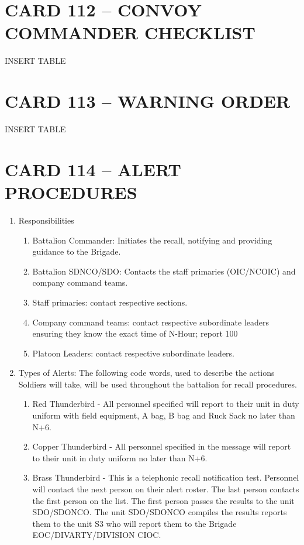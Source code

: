 \documentclass{article}
\begin{document}
\newpage
\section*{CARD 112 – CONVOY COMMANDER CHECKLIST}
INSERT TABLE

\newpage
\section*{CARD 113 – WARNING ORDER	}
INSERT TABLE

\newpage
\section*{CARD 114 – ALERT PROCEDURES}
\begin{enumerate}
    \item Responsibilities
    \begin{enumerate}
        \item Battalion Commander: Initiates the recall, notifying and providing guidance to the Brigade.
\item	Battalion SDNCO/SDO: Contacts the staff primaries (OIC/NCOIC) and company command teams.
\item	Staff primaries: contact respective sections.
\item	Company command teams: contact respective subordinate leaders ensuring they know the exact time of N-Hour; report 100%
\item	Platoon Leaders: contact respective subordinate leaders.
\end{enumerate}
\item	Types of Alerts: The following code words, used to describe the actions Soldiers will take, will be used throughout the battalion for recall procedures.
\begin{enumerate}
    \item	Red Thunderbird - All personnel specified will report to their unit in duty uniform with field equipment, A bag, B bag and Ruck Sack no later than N+6.
\item	Copper Thunderbird - All personnel specified in the message will report to their unit in duty uniform no later than N+6.
\item	Brass Thunderbird - This is a telephonic recall notification test. Personnel will contact the next person on their alert roster. The last person contacts the first person on the list. The first person passes the results to the unit SDO/SDONCO. The unit SDO/SDONCO compiles the results reports them to the unit S3 who will report them to the Brigade EOC/DIVARTY/DIVISION CIOC.

\end{enumerate}
\end{enumerate}
\end{document}
